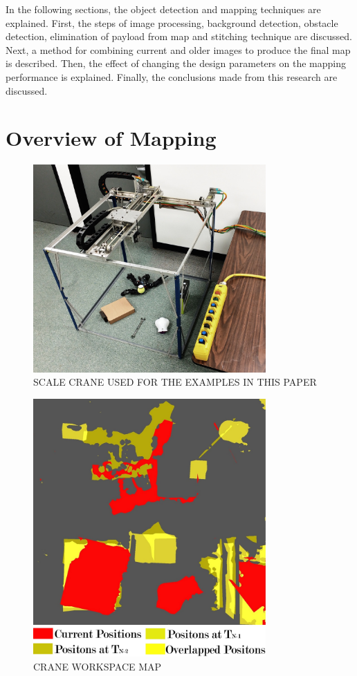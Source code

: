\documentclass[twocolumn,10pt]{asme2e}
\begin{document}
In the following sections, the object detection and mapping techniques are explained. First, the steps of image processing, background detection, obstacle detection, elimination of payload from map and stitching technique are discussed. Next, a method for combining current and older images to produce the final map is described. Then, the effect of changing the design parameters on the mapping performance is explained. Finally, the conclusions made from this research are discussed.

\section*{Overview of Mapping}


\begin{figure}[tb]
\begin{center}
\includegraphics[width=3.5in]{scale_crane}
\caption{SCALE CRANE USED FOR THE EXAMPLES IN THIS PAPER}
\label{default}
\end{center}
\end{figure}

\begin{figure}[t]
\begin{center}
\includegraphics[width=3.5in]{overlapped}
\caption{CRANE WORKSPACE MAP}
\label{default}
\end{center}
\end{figure}
\end{document}
